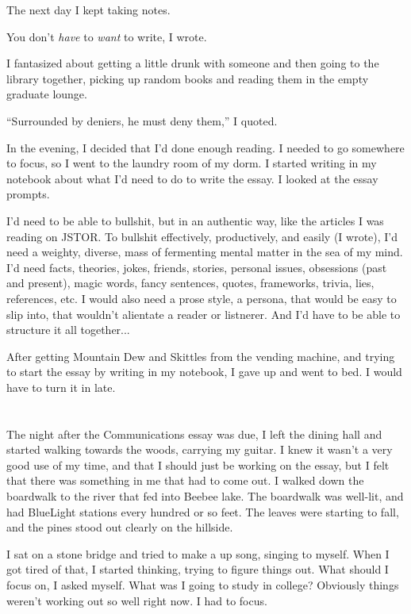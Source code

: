The next day I kept taking notes.

You don't \textit{have} to \textit{want} to write, I wrote.

I fantasized about getting a little drunk with someone and then going to the
library together, picking up random books and reading them in the empty graduate
lounge.

``Surrounded by deniers, he must deny them,'' I quoted.

In the evening, I decided that I'd done enough reading.  I needed to go
somewhere to focus, so I went to the laundry room of my dorm.  I started writing
in my notebook about what I'd need to do to write the essay.  I looked at the
essay prompts.

I'd need to be able to bullshit, but in an authentic way, like the articles I
was reading on JSTOR.  To bullshit effectively, productively, and easily  (I
wrote), I'd need a weighty, diverse, mass of fermenting mental matter in the sea
of my mind.  I'd need facts, theories, jokes, friends, stories, personal issues,
obsessions (past and present), magic words, fancy sentences, quotes, frameworks,
trivia, lies, references, etc.  I would also need a prose style, a persona, that
would be easy to slip into, that wouldn't alientate a reader or listnerer.  And
I'd have to be able to structure it all together...

After getting Mountain Dew and Skittles from the vending machine, and trying to
start the essay by writing in my notebook, I gave up and went to bed.  I would
have to turn it in late.

\section{}

The night after the Communications essay was due, I left the dining hall and
started walking towards the woods, carrying my guitar.  I knew it wasn't a very
good use of my time, and that I should just be working on the essay, but I felt
that there was something in me that had to come out.  I walked down the
boardwalk to the river that fed into Beebee lake.  The boardwalk was well-lit,
and had BlueLight stations every hundred or so feet.  The leaves were starting to
fall, and the pines stood out clearly on the hillside.

I sat on a stone bridge and tried to make a up song, singing to myself.  When I
got tired of that, I started thinking, trying to figure things out.  What should
I focus on, I asked myself.  What was I going to study in college?  Obviously
things weren't working out so well right now.  I had to focus.

